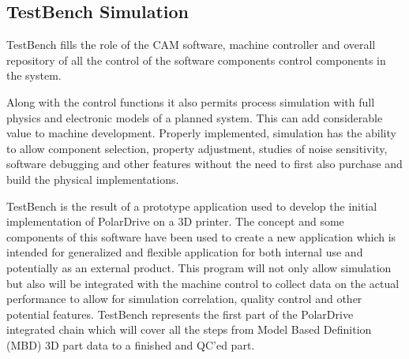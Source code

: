 \documentclass{article}
\begin{document}
\subsection{TestBench Simulation}
TestBench fills the role of the CAM software, machine controller and overall repository of all the control of the software components control components in the system. \par
Along with the control functions it also permits process simulation with full physics and electronic models of a planned system. This can add considerable value to machine development. Properly implemented, simulation has the ability to allow component selection, property adjustment, studies of noise sensitivity, software debugging and other features without the need to first also purchase and build the physical implementations. 
\par 
TestBench is the result of a prototype application used to develop the initial implementation of PolarDrive on a 3D printer. The concept and some components of this software have been used to create a new application which is intended for generalized and flexible application for both internal use and potentially as an external product. This program will not only allow simulation but also will be integrated with the machine control to collect data on the actual performance to allow for simulation correlation, quality control and other potential features. TestBench represents the first part of the PolarDrive integrated chain which will cover all the steps from Model Based Definition (MBD) 3D part data to a finished and QC'ed part.  
\end{document}

